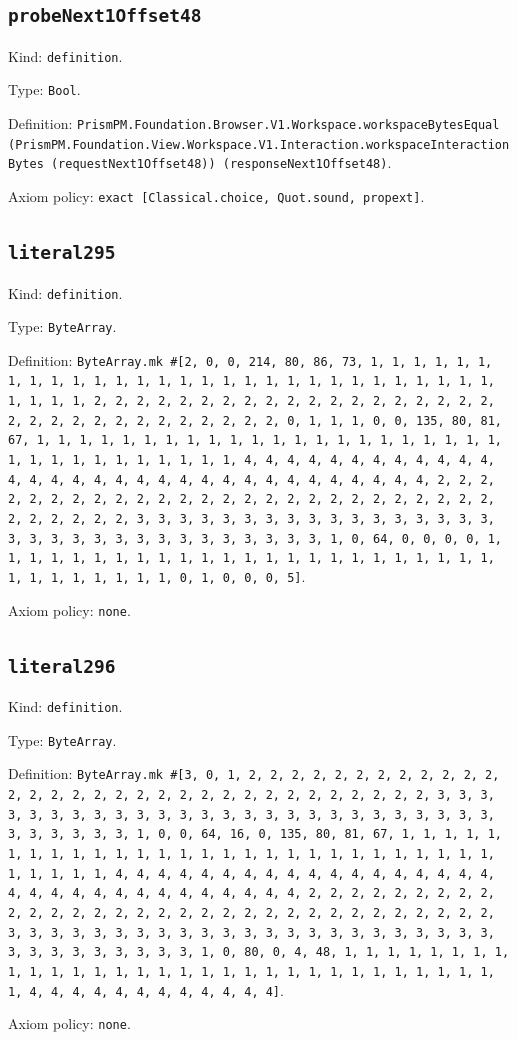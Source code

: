 \documentclass[11pt]{article}
\begin{document}
\subsection*{\texttt{probeNext1Offset48}}
\noindent Kind: \texttt{definition}.\par
\noindent Type: \texttt{Bool}.\par
\noindent Definition: \texttt{PrismPM.Foundation.Browser.V1.Workspace.workspaceBytesEqual (PrismPM.Foundation.View.Workspace.V1.Interaction.workspaceInteractionBytes (requestNext1Offset48)) (responseNext1Offset48)}.\par
\noindent Axiom policy: \texttt{exact [Classical.choice, Quot.sound, propext]}.\par
\subsection*{\texttt{literal295}}
\noindent Kind: \texttt{definition}.\par
\noindent Type: \texttt{ByteArray}.\par
\noindent Definition: \texttt{ByteArray.mk \#[2, 0, 0, 214, 80, 86, 73, 1, 1, 1, 1, 1, 1, 1, 1, 1, 1, 1, 1, 1, 1, 1, 1, 1, 1, 1, 1, 1, 1, 1, 1, 1, 1, 1, 1, 1, 1, 1, 1, 1, 2, 2, 2, 2, 2, 2, 2, 2, 2, 2, 2, 2, 2, 2, 2, 2, 2, 2, 2, 2, 2, 2, 2, 2, 2, 2, 2, 2, 2, 2, 2, 2, 0, 1, 1, 1, 0, 0, 135, 80, 81, 67, 1, 1, 1, 1, 1, 1, 1, 1, 1, 1, 1, 1, 1, 1, 1, 1, 1, 1, 1, 1, 1, 1, 1, 1, 1, 1, 1, 1, 1, 1, 1, 1, 1, 4, 4, 4, 4, 4, 4, 4, 4, 4, 4, 4, 4, 4, 4, 4, 4, 4, 4, 4, 4, 4, 4, 4, 4, 4, 4, 4, 4, 4, 4, 4, 4, 2, 2, 2, 2, 2, 2, 2, 2, 2, 2, 2, 2, 2, 2, 2, 2, 2, 2, 2, 2, 2, 2, 2, 2, 2, 2, 2, 2, 2, 2, 2, 2, 3, 3, 3, 3, 3, 3, 3, 3, 3, 3, 3, 3, 3, 3, 3, 3, 3, 3, 3, 3, 3, 3, 3, 3, 3, 3, 3, 3, 3, 3, 3, 3, 1, 0, 64, 0, 0, 0, 0, 1, 1, 1, 1, 1, 1, 1, 1, 1, 1, 1, 1, 1, 1, 1, 1, 1, 1, 1, 1, 1, 1, 1, 1, 1, 1, 1, 1, 1, 1, 1, 1, 0, 1, 0, 0, 0, 5]}.\par
\noindent Axiom policy: \texttt{none}.\par
\subsection*{\texttt{literal296}}
\noindent Kind: \texttt{definition}.\par
\noindent Type: \texttt{ByteArray}.\par
\noindent Definition: \texttt{ByteArray.mk \#[3, 0, 1, 2, 2, 2, 2, 2, 2, 2, 2, 2, 2, 2, 2, 2, 2, 2, 2, 2, 2, 2, 2, 2, 2, 2, 2, 2, 2, 2, 2, 2, 2, 2, 2, 3, 3, 3, 3, 3, 3, 3, 3, 3, 3, 3, 3, 3, 3, 3, 3, 3, 3, 3, 3, 3, 3, 3, 3, 3, 3, 3, 3, 3, 3, 3, 3, 1, 0, 0, 64, 16, 0, 135, 80, 81, 67, 1, 1, 1, 1, 1, 1, 1, 1, 1, 1, 1, 1, 1, 1, 1, 1, 1, 1, 1, 1, 1, 1, 1, 1, 1, 1, 1, 1, 1, 1, 1, 1, 1, 4, 4, 4, 4, 4, 4, 4, 4, 4, 4, 4, 4, 4, 4, 4, 4, 4, 4, 4, 4, 4, 4, 4, 4, 4, 4, 4, 4, 4, 4, 4, 4, 2, 2, 2, 2, 2, 2, 2, 2, 2, 2, 2, 2, 2, 2, 2, 2, 2, 2, 2, 2, 2, 2, 2, 2, 2, 2, 2, 2, 2, 2, 2, 2, 3, 3, 3, 3, 3, 3, 3, 3, 3, 3, 3, 3, 3, 3, 3, 3, 3, 3, 3, 3, 3, 3, 3, 3, 3, 3, 3, 3, 3, 3, 3, 3, 1, 0, 80, 0, 4, 48, 1, 1, 1, 1, 1, 1, 1, 1, 1, 1, 1, 1, 1, 1, 1, 1, 1, 1, 1, 1, 1, 1, 1, 1, 1, 1, 1, 1, 1, 1, 1, 1, 4, 4, 4, 4, 4, 4, 4, 4, 4, 4, 4, 4]}.\par
\noindent Axiom policy: \texttt{none}.\par
\end{document}
